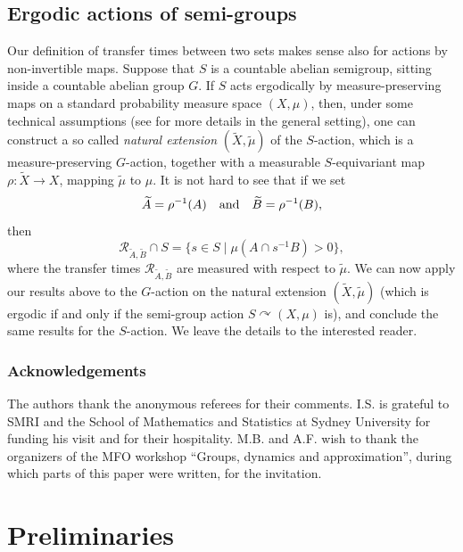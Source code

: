 \documentclass[JEP,XML,SOM,Unicode]{cedram}
\let\mathcal\mathscr
\newcommand{\cR}{\mathcal{R}}
\newcommand{\qand}{\quad\textup{and}\quad}
\let\acts\curvearrowright
\theoremstyle{plain}
\theoremstyle{definition}
\begin{document}
\subsection{Ergodic actions of semi-groups}

Our definition of transfer times between two sets makes sense also for actions by non-invertible maps. Suppose that $S$ is a countable
abelian semigroup, sitting inside a countable abelian group $G$. If $S$ acts ergodically by measure-preserving maps on a standard
probability measure space $(X,\mu)$, then, under some technical assumptions (see \eg \cite{La} for more details in the general setting), one can construct a
so called \emph{natural extension} $(\widetilde{X},\widetilde{\mu})$ of the $S$-action, which is a measure-preserving $G$-action, together with
a measurable $S$-equivariant map $\rho : \widetilde{X} \to X$, mapping $\widetilde{\mu}$ to $\mu$. It is not hard to see that if we
set
\[
\widetilde{A} = \rho^{-1}(A) \qand \widetilde{B} = \rho^{-1}(B),
\]
then
\[
\cR_{\widetilde{A},\widetilde{B}} \cap S = \bigl\{ s \in S \mid  \mu(A \cap s^{-1}B) > 0 \bigr\},
\]
where the transfer times $\cR_{\widetilde{A},\widetilde{B}}$ are measured with respect to $\tilde{\mu}$. We can now apply our results above
to the $G$-action on the natural extension $(\widetilde{X},\widetilde{\mu})$ (which is ergodic if and only if the semi-group action $S \acts (X,\mu)$ is), and conclude the same results for the
$S$-action. We leave the details to the interested reader.

\subsubsection*{Acknowledgements}
The authors thank the anonymous referees for their comments. I.S. is grateful to SMRI and the School of Mathematics and Statistics at Sydney University for funding his visit and for their hospitality.
M.B. and A.F. wish to thank the organizers of the MFO workshop ``Groups, dynamics and approximation'', during which parts of this paper
were written, for the invitation.

\section{Preliminaries}
\end{document}
